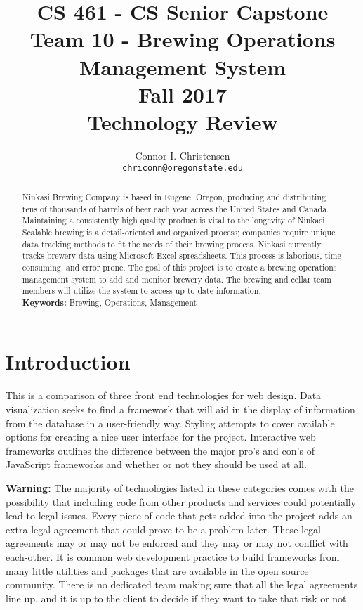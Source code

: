 \documentclass[draftclsnofoot,onecolumn,letterpaper,10pt,compsoc]{IEEEtran}
\title{CS 461 - CS Senior Capstone
  \\Team 10 - Brewing Operations Management System
	\\Fall 2017
	\\Technology Review
}
\author{
	Connor I. Christensen \\
	\texttt{chriconn@oregonstate.edu}
}
\begin{document}
\begin{titlingpage}
    \maketitle
    \begin{abstract}
      Ninkasi Brewing Company is based in Eugene, Oregon, producing and distributing tens of thousands of barrels of beer each year across the United States and Canada.
      Maintaining a consistently high quality product is vital to the longevity of Ninkasi.
      Scalable brewing is a detail-oriented and organized process; companies require unique data tracking methods to fit the needs of their brewing process.
      Ninkasi currently tracks brewery data using Microsoft Excel spreadsheets.
      This process is laborious, time consuming, and error prone.
      The goal of this project is to create a brewing operations management system to add and monitor brewery data.
      The brewing and cellar team members will utilize the system to access up-to-date information.
      \\
      \textbf{Keywords:} Brewing, Operations, Management
    \end{abstract}
		\pagebreak
		\tableofcontents
\end{titlingpage}

\section{Introduction}

This is a comparison of three front end technologies for web design.
Data visualization seeks to find a framework that will aid in the display of information from the database in a user-friendly way.
Styling attempts to cover available options for creating a nice user interface for the project.
Interactive web frameworks outlines the difference between the major pro's and con's of JavaScript frameworks and whether or not they should be used at all.

\textbf{Warning:}
The majority of technologies listed in these categories comes with the possibility that including code from other products and services could potentially lead to legal issues.
Every piece of code that gets added into the project adds an extra legal agreement that could prove to be a problem later.
These legal agreements may or may not be enforced and they may or may not conflict with each-other.
It is common web development practice to build frameworks from many little utilities and packages that are available in the open source community.
There is no dedicated team making sure that all the legal agreements line up, and it is up to the client to decide if they want to take that risk or not.
\end{document}
